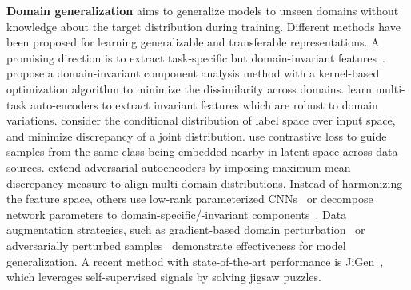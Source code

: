 \documentclass{article}
\begin{document}
\textbf{Domain generalization} aims to generalize models to unseen domains without knowledge about the target distribution during training. Different methods have been proposed for learning generalizable and transferable representations.
A promising direction is to extract task-specific but domain-invariant features~\citep{ghifary2015domain,li2018domain,li2018deep,motiian2017unified,muandet2013domain}. 
\citet{muandet2013domain} propose a domain-invariant component analysis method with a kernel-based optimization algorithm to minimize the dissimilarity across domains.
\citet{ghifary2015domain} learn multi-task auto-encoders to extract invariant features which are robust to domain variations.
\citet{li2018deep} consider the conditional distribution of label space over input space, and minimize discrepancy of a joint distribution. \citet{motiian2017unified} use contrastive loss to guide samples from the same class being embedded nearby in latent space across data sources.
\citet{li2018domain} extend adversarial autoencoders by imposing maximum mean discrepancy measure to align multi-domain distributions.
Instead of harmonizing the feature space, others use low-rank parameterized CNNs~\citep{li2017deeper} or decompose network parameters to domain-specific/-invariant components~\citep{khosla2012undoing}.
Data augmentation strategies, such as gradient-based domain perturbation~\citep{shankar2018generalizing} or adversarially perturbed samples~\citep{volpi2018generalizing}
demonstrate effectiveness for model generalization.
A recent method with state-of-the-art performance is JiGen~\cite{carlucci2019domain}, which leverages self-supervised signals by solving jigsaw puzzles.
\end{document}
